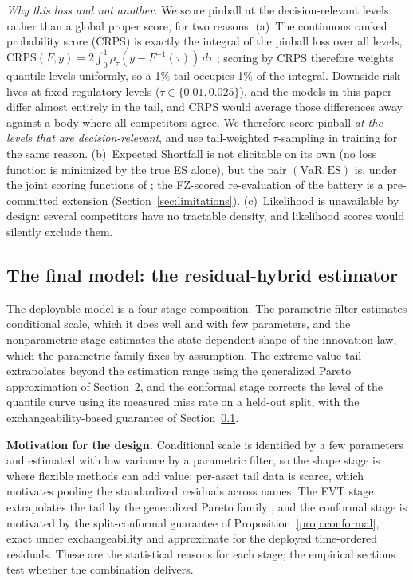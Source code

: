 \documentclass[11pt]{article}
\newcommand{\VaR}{\mathrm{VaR}}
\newcommand{\ES}{\mathrm{ES}}
\theoremstyle{remark}
\begin{document}
\emph{Why this loss and not another.} We score pinball at the
decision-relevant levels rather than a global proper score, for two
reasons. (a)~The continuous ranked probability
score (CRPS) is exactly the integral of the pinball loss over all
levels, $\mathrm{CRPS}(F,y) = 2\int_0^1 \rho_\tau(y - F^{-1}(\tau))\,
d\tau$ \citep{gneitingraftery2007}; scoring by CRPS therefore weights
quantile levels uniformly, so a 1\% tail occupies 1\% of the
integral. Downside
risk lives at fixed regulatory levels ($\tau \in \{0.01, 0.025\}$), and
the models in this paper differ almost entirely in the tail, and CRPS
would average those differences away against a body where all
competitors agree. We therefore score pinball \emph{at the levels that
are decision-relevant}, and use tail-weighted $\tau$-sampling in
training for the same reason. (b)~Expected Shortfall is not elicitable
on its own (no loss function is minimized by the true ES alone), but
the pair $(\VaR,\ES)$ is, under the joint scoring functions of
\citet{fissler2016}; the FZ-scored re-evaluation of the battery is a
pre-committed extension (Section~\ref{sec:limitations}). (c)~Likelihood is
unavailable by design: several competitors have no tractable density, and likelihood scores
would silently exclude them.

\subsection{The final model: the residual-hybrid estimator}\label{sec:hybrid}

The deployable model is a four-stage composition. The parametric
filter estimates conditional scale, which it does well and with few
parameters, and the nonparametric stage estimates the state-dependent
shape of the innovation law, which the parametric family fixes by
assumption. The extreme-value tail extrapolates beyond the estimation
range using the generalized Pareto approximation of Section~2, and the
conformal stage corrects the level of the quantile curve using its
measured miss rate on a held-out split, with the exchangeability-based
guarantee of Section~\ref{sec:hybrid}.

\noindent\textbf{Motivation for the design.} Conditional scale is
identified by a few parameters and estimated with low variance by a
parametric filter, so the shape stage is where flexible methods can
add value; per-asset tail data is scarce, which motivates pooling the
standardized residuals across names. The EVT stage extrapolates the
tail by the generalized Pareto family \citep{balkema1974,
pickands1975}, and the conformal stage is motivated by the
split-conformal guarantee of Proposition~\ref{prop:conformal}, exact
under exchangeability and approximate for the deployed time-ordered
residuals. These are the
statistical reasons for each stage; the empirical sections test
whether the combination delivers.
\end{document}
